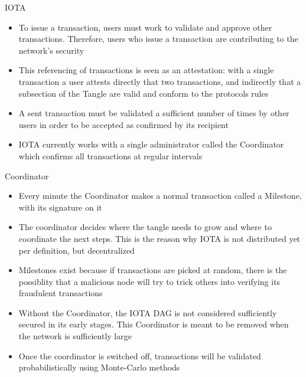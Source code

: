 \documentclass[11pt]{beamer}
\begin{document}

\begin{frame}{IOTA}
	\begin{itemize}
		\item To issue a transaction, users must work to validate and approve other transactions. Therefore, users who issue a transaction are contributing to the network's security
		\item This referencing of transactions is seen as an attestation: with a single transaction a user attests directly that two transactions, and indirectly that a subsection of the Tangle are valid and conform to the protocols rules
		\item A sent transaction must be validated a sufficient number of times by other users in order to be accepted as confirmed by its recipient
		\item IOTA currently works with a single administrator called the Coordinator which confirms all transactions at regular intervals
	\end{itemize}
\end{frame}


\begin{frame}{Coordinator}
	\begin{itemize}
		\item Every minute the Coordinator makes a normal transaction called a Milestone, with its signature on it
		\item The coordinator decides where the tangle needs to grow and where to coordinate the next steps. This is the reason why IOTA is not distributed yet per definition, but decentralized
		\item Milestones exist because if transactions are picked at random, there is the possiblity that a malicious node will try to trick others into verifying its fraudulent transactions
		\item Without the Coordinator, the IOTA DAG is not considered sufficiently secured in its early stages. This Coordinator is meant to be removed when the network is sufficiently large
		\item Once the coordinator is switched off, transactions will be validated probabilistically using Monte-Carlo methods
	\end{itemize}
\end{frame}

\end{document}
